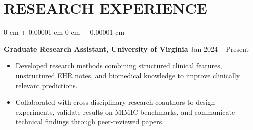 \documentclass[10pt, letterpaper]{article}
\newenvironment{highlights}{
    \begin{itemize}[
        topsep=0.10 cm,
        parsep=0.10 cm,
        partopsep=0pt,
        itemsep=0pt,
        leftmargin=0 cm + 10pt
    ]
}{
    \end{itemize}
} %
\newenvironment{onecolentry}{
    \begin{adjustwidth}{
        0 cm + 0.00001 cm
    }{
        0 cm + 0.00001 cm
    }
}{
    \end{adjustwidth}
} %
\begin{document}
\section{RESEARCH EXPERIENCE}
\begin{onecolentry}
\textbf{Graduate Research Assistant, University of Virginia} \hfill Jan 2024 -- Present
\begin{highlights}
\item Developed research methods combining structured clinical features, unstructured EHR notes, and biomedical knowledge to improve clinically relevant predictions.
\item Collaborated with cross-disciplinary research coauthors to design experiments, validate results on MIMIC benchmarks, and communicate technical findings through peer-reviewed papers.
\end{highlights}
\end{onecolentry}
\end{document}
